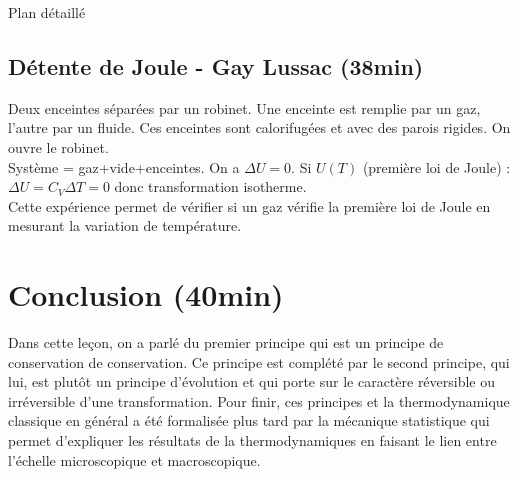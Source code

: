 \begin{reportBlock}{Plan détaillé}
  \subsection{Détente de Joule - Gay Lussac (38min)}
  Deux enceintes séparées par un robinet. Une enceinte est remplie par un gaz, l'autre par un fluide. Ces enceintes sont calorifugées et avec des parois rigides. On ouvre le robinet. \\
  Système = {gaz+vide+enceintes}. On a $\Delta U=0$. Si $U(T)$ (première loi de Joule) : $\Delta U = C_{V}\Delta T = 0$ donc transformation isotherme. \\
  Cette expérience permet de vérifier si un gaz vérifie la première loi de Joule en mesurant la variation de température.
  
  \section*{Conclusion (40min)}
  Dans cette leçon, on a parlé du premier principe qui est un principe de conservation de conservation. Ce principe est complété par le second principe, qui lui, est plutôt un principe d'évolution et qui porte sur le caractère réversible ou irréversible d'une transformation. Pour finir, ces principes et la thermodynamique classique en général a été formalisée plus tard par la mécanique statistique qui permet d'expliquer les résultats de la thermodynamiques en faisant le lien entre l'échelle microscopique et macroscopique.



\end{reportBlock}


